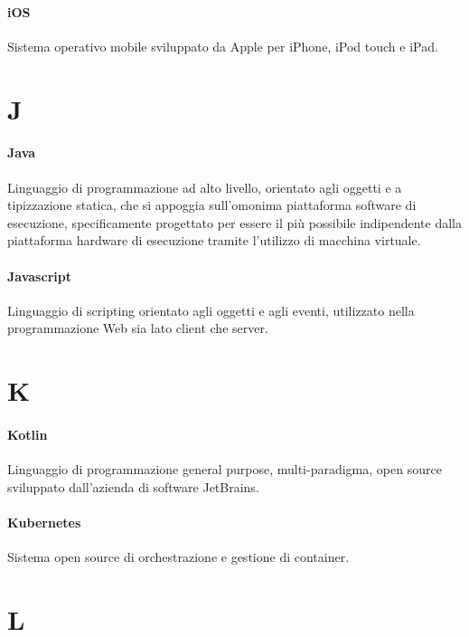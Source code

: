 \documentclass[]{article}
\begin{document}
	\paragraph*{iOS}
	Sistema operativo mobile sviluppato da Apple per iPhone, iPod touch e iPad.
		
	\newpage
	
	\section*{J}
	
	\paragraph*{Java}
	Linguaggio di programmazione ad alto livello, orientato agli oggetti e a tipizzazione statica, che si appoggia sull'omonima piattaforma software di esecuzione, specificamente progettato per essere il più possibile indipendente dalla piattaforma hardware di esecuzione tramite l'utilizzo di macchina virtuale.
	
	\paragraph*{Javascript}
	Linguaggio di scripting orientato agli oggetti e agli eventi, utilizzato nella programmazione Web sia lato client che server.
	
	\newpage
	
	\section*{K}
	
	\paragraph*{Kotlin}
	Linguaggio di programmazione general purpose, multi-paradigma, open source sviluppato dall'azienda di software JetBrains.
	
	\paragraph*{Kubernetes}
	Sistema open source di orchestrazione e gestione di container.
	
	\newpage 
	
	\section*{L}
	
\end{document}

